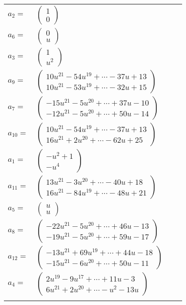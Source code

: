 \documentclass[1p]{elsarticle_modified}
\theoremstyle{definition}
\begin{document}
\begin{tabular}{m{7pt} m{180pt} m{7pt} m{180pt} }
\flushright $a_{2}=$&$\begin{pmatrix}1\\0\end{pmatrix}$ \\
\flushright $a_{6}=$&$\begin{pmatrix}0\\u\end{pmatrix}$ \\
\flushright $a_{3}=$&$\begin{pmatrix}1\\u^2\end{pmatrix}$ \\
\flushright $a_{9}=$&$\begin{pmatrix}10 u^{21}-54 u^{19}+\cdots-37 u+13\\10 u^{21}-53 u^{19}+\cdots-32 u+15\end{pmatrix}$ \\
\flushright $a_{7}=$&$\begin{pmatrix}-15 u^{21}-5 u^{20}+\cdots+37 u-10\\-12 u^{21}-5 u^{20}+\cdots+50 u-14\end{pmatrix}$ \\
\flushright $a_{10}=$&$\begin{pmatrix}10 u^{21}-54 u^{19}+\cdots-37 u+13\\16 u^{21}+2 u^{20}+\cdots-62 u+25\end{pmatrix}$ \\
\flushright $a_{1}=$&$\begin{pmatrix}- u^2+1\\- u^4\end{pmatrix}$ \\
\flushright $a_{11}=$&$\begin{pmatrix}13 u^{21}-3 u^{20}+\cdots-40 u+18\\16 u^{21}-84 u^{19}+\cdots-48 u+21\end{pmatrix}$ \\
\flushright $a_{5}=$&$\begin{pmatrix}u\\u\end{pmatrix}$ \\
\flushright $a_{8}=$&$\begin{pmatrix}-22 u^{21}-5 u^{20}+\cdots+46 u-13\\-19 u^{21}-5 u^{20}+\cdots+59 u-17\end{pmatrix}$ \\
\flushright $a_{12}=$&$\begin{pmatrix}-13 u^{21}+69 u^{19}+\cdots+44 u-18\\-15 u^{21}-6 u^{20}+\cdots+50 u-11\end{pmatrix}$ \\
\flushright $a_{4}=$&$\begin{pmatrix}2 u^{19}-9 u^{17}+\cdots+11 u-3\\6 u^{21}+2 u^{20}+\cdots- u^2-13 u\end{pmatrix}$\\&\end{tabular}
\end{document}
